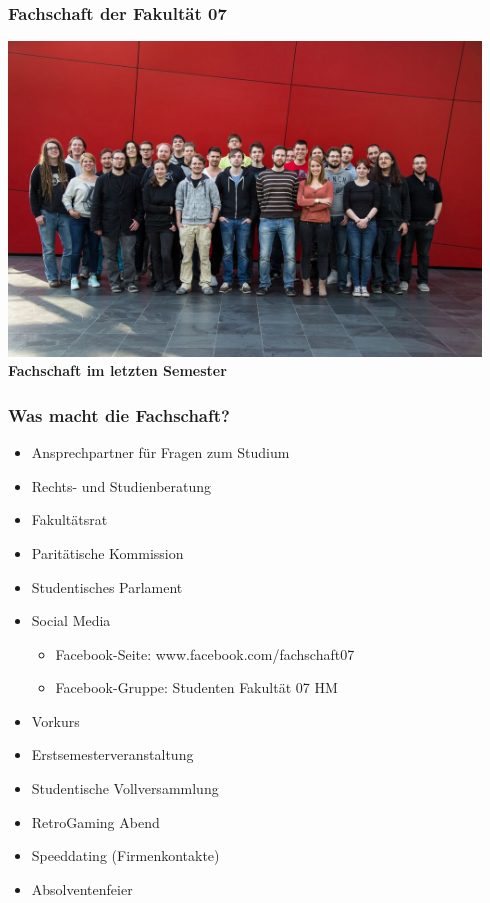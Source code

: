 \documentclass{beamer}
\begin{document}
    \begin{frame} 
        \frametitle{Fachschaft der Fakultät 07}
        \includegraphics[width=0.94\textwidth]{fachschaft.jpg}
        \\
        \textbf{Fachschaft im letzten Semester}
    \end{frame}
    
    \begin{frame}[t]
    	\frametitle{Was macht die Fachschaft?}
    	
    	\begin{itemize}
    		\item Ansprechpartner für Fragen zum Studium
    		\item Rechts- und Studienberatung
    		\item Fakultätsrat
    		\item Paritätische Kommission
    		\item Studentisches Parlament
    		\item Social Media
    		\begin{itemize}
    			\item Facebook-Seite: www.facebook.com/fachschaft07
    			\item Facebook-Gruppe: Studenten Fakultät 07 HM
    		\end{itemize}
    	\end{itemize}
    	\bigskip
    	\begin{itemize}
    		\item Vorkurs
    		\item Erstsemesterveranstaltung
    		\item Studentische Vollversammlung
    		\item RetroGaming Abend
    		\item Speeddating (Firmenkontakte)
    		\item Absolventenfeier
    	\end{itemize}
    \end{frame}
    
\end{document}
